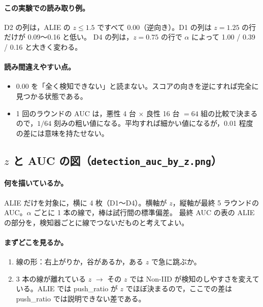 \documentclass[a4j, dvipdfmx]{jsarticle}  %
\begin{document}
\paragraph{この実験での読み取り例。}
D2 の列は，ALIE の $z \le 1.5$ ですべて 0.00（逆向き）。D1 の列は $z = 1.25$ の行だけが 0.09〜0.16 と低い。
D4 の列は，$z = 0.75$ の行で $\alpha$ によって 1.00 / 0.39 / 0.16 と大きく変わる。

\paragraph{読み間違えやすい点。}
\begin{itemize}
  \item 0.00 を「全く検知できない」と読まない。スコアの向きを逆にすれば完全に見つかる状態である。
  \item 1 回のラウンドの AUC は，悪性 4 台 $\times$ 良性 16 台 $= 64$ 組の比較で決まるので，$1/64$ 刻みの粗い値になる。平均すれば細かい値になるが，0.01 程度の差には意味を持たせない。
\end{itemize}

\subsection{$z$ と AUC の図（\texttt{detection\_auc\_by\_z.png}）}

\paragraph{何を描いているか。}
ALIE だけを対象に，横に 4 枚（D1〜D4）。横軸が $z$，縦軸が最終 5 ラウンドの AUC。$\alpha$ ごとに 1 本の線で，棒は試行間の標準偏差。
最終 AUC の表の ALIE の部分を，検知器ごとに線でつないだものと考えてよい。

\paragraph{まずどこを見るか。}
\begin{enumerate}
  \item 線の形：右上がりか，谷があるか，ある $z$ で急に跳ぶか。
  \item 3 本の線が離れている $z$ $\rightarrow$ その $z$ では Non-IID が検知のしやすさを変えている。ALIE では push\_ratio が $z$ でほぼ決まるので，ここでの差は push\_ratio では説明できない差である。
\end{enumerate}
\end{document}
